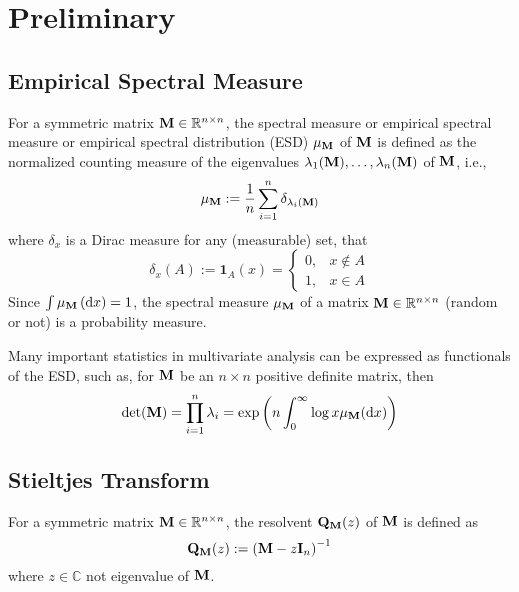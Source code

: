 \chapter{Preliminary}

\section{Empirical Spectral Measure}

\begin{definition}
	For a symmetric matrix ${\bf M}\in{\mathbb R}^{n\times n}$, the spectral measure or empirical spectral measure or empirical spectral distribution (ESD) $\mu_{{\bf M}}$ of ${\bf M}$ is defined as the normalized counting measure of the eigenvalues $\lambda_{1}({\bf M}),\ldots,\lambda_{n}({\bf M})$ of ${\bf M}$, i.e.,
	\begin{equation}
		\mu_{{\bf M}}:=\frac{1}{n}\sum_{i=1}^{n}\delta_{\lambda_{i}({\bf M})}
	\end{equation}
	where $\delta_{x}$ is a Dirac measure for any (measurable) set, that
	\begin{equation*}
		\delta_{x}(A):=\mathbf{1}_{A}(x)=
		\begin{cases}
			0, & x\notin A \\
			1, & x\in A
		\end{cases}
	\end{equation*}
	Since $\int\mu_{{\bf M}}\left(\mathop{}\!\mathrm{d} x\right)=1$, the spectral measure $\mu_{{\bf M}}$ of a matrix ${\bf M}\in{\mathbb R}^{n\times n}$ (random or not) is a probability measure.
\end{definition}

\begin{remark}
	Many important statistics in multivariate analysis can be expressed as functionals of the ESD, such as, for ${\bf M}$ be an $n\times n$ positive definite matrix, then
	\begin{equation}
		\operatorname{det}({\bf M})=\prod_{i=1}^{n}\lambda_{i}=\exp\left(n\int_{0}^{\infty}\log x\mu_{{\bf M}}(\mathop{}\!\mathrm{d} x)\right)
	\end{equation}
\end{remark}

\section{Stieltjes Transform}

\begin{definition}[Resolvent]
	For a symmetric matrix ${\bf M}\in{\mathbb R}^{n\times n}$, the resolvent ${\bf Q}_{{\bf M}}(z)$ of ${\bf M}$ is defined as
	\begin{equation}
		{\bf Q}_{{\bf M}}(z):=\left({\bf M}-z\mathbf{I}_{n}\right)^{-1}
	\end{equation}
	where $z\in\mathbb{C}$ not eigenvalue of ${\bf M}$.
\end{definition}

